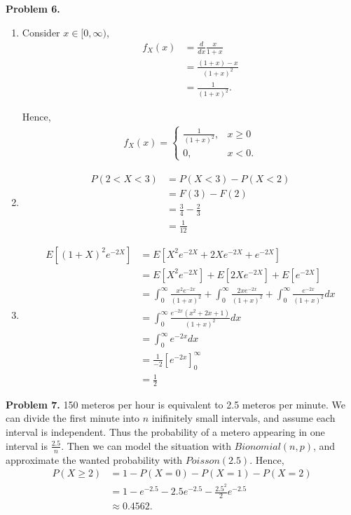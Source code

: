 \documentclass{article}
\begin{document}
\textbf{Problem 6.}
\begin{enumerate}[label={(\alph*)}]
    \item 
    Consider $x \in [0,\infty)$,
    \begin{align}
        f_X(x) & = \frac{d}{dx}\frac{x}{1+x} \\
        & = \frac{(1+x)-x}{(1+x)^2} \\
        & = \frac{1}{(1+x)^2}.
    \end{align}

    Hence, 
    \begin{align}
        f_X(x) = 
        \begin{cases}
            \frac{1}{(1+x)^2}, & x \ge 0 \\
            0, & x < 0  .
        \end{cases}
    \end{align}

    \item 
    \begin{align}
        P(2<X<3) & = P(X<3)-P(X<2) \\
        & = F(3) - F(2) \\
        & = \frac{3}{4} - \frac{2}{3} \\ 
        & = \frac{1}{12}
    \end{align}

    \item 
    \begin{align}
        E\left[(1+X)^2e^{-2X}\right] & = E\left[X^2e^{-2X}+2Xe^{-2X}+e^{-2X}\right] \\
        & = E\left[X^2e^{-2X}\right] + E\left[2Xe^{-2X}\right] + E\left[e^{-2X}\right] \\
        & = \int_{0}^{\infty}\frac{x^2e^{-2x}}{(1+x)^2}+\int_{0}^{\infty}\frac{2xe^{-2x}}{(1+x)^2}+\int_{0}^{\infty}\frac{e^{-2x}}{(1+x)^2}dx \\ 
        & = \int_{0}^{\infty}\frac{e^{-2x}(x^2+2x+1)}{(1+x)^2}dx \\
        & = \int_{0}^{\infty}e^{-2x}dx \\
        & = \frac{1}{-2}\left[e^{-2x}\right]_0^{\infty} \\
        & = \frac{1}{2}
    \end{align}
\end{enumerate}
\pagebreak

\textbf{Problem 7.}
150 meteros per hour is equivalent to 2.5 meteros per minute. 
We can divide the first minute into $n$ inifinitely small intervals, and assume each interval is independent. 
Thus the probability of a metero appearing in one interval is $\frac{2.5}{n}$. 
Then we can model the situation with $Bionomial(n,p)$, and approximate the wanted probability with $Poisson(2.5)$.
Hence,
\begin{align}
    P(X \ge 2) & = 1 - P(X=0) - P(X=1) - P(X=2) \\
    & = 1 - e^{-2.5} - 2.5e^{-2.5} - \frac{2.5^2}{2}e^{-2.5} \\
    & \approx 0.4562.
\end{align}
\bigbreak
\end{document}
